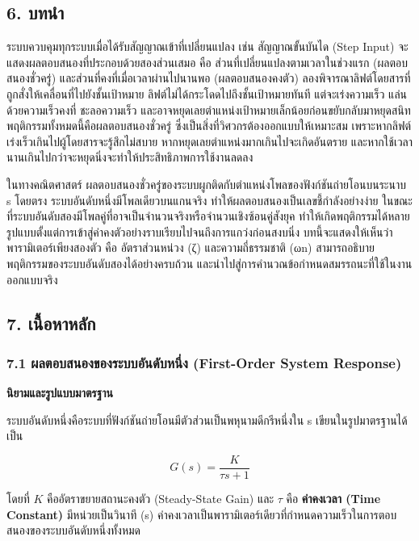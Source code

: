 \newpage

\subsection{6. บทนำ}

ระบบควบคุมทุกระบบเมื่อได้รับสัญญาณเข้าที่เปลี่ยนแปลง เช่น สัญญาณขั้นบันได (Step Input) จะแสดงผลตอบสนองที่ประกอบด้วยสองส่วนเสมอ คือ ส่วนที่เปลี่ยนแปลงตามเวลาในช่วงแรก (ผลตอบสนองชั่วครู่) และส่วนที่คงที่เมื่อเวลาผ่านไปนานพอ (ผลตอบสนองคงตัว) ลองพิจารณาลิฟต์โดยสารที่ถูกสั่งให้เคลื่อนที่ไปยังชั้นเป้าหมาย ลิฟต์ไม่ได้กระโดดไปถึงชั้นเป้าหมายทันที แต่จะเร่งความเร็ว แล่นด้วยความเร็วคงที่ ชะลอความเร็ว และอาจหยุดเลยตำแหน่งเป้าหมายเล็กน้อยก่อนขยับกลับมาหยุดสนิท พฤติกรรมทั้งหมดนี้คือผลตอบสนองชั่วครู่ ซึ่งเป็นสิ่งที่วิศวกรต้องออกแบบให้เหมาะสม เพราะหากลิฟต์เร่งเร็วเกินไปผู้โดยสารจะรู้สึกไม่สบาย หากหยุดเลยตำแหน่งมากเกินไปจะเกิดอันตราย และหากใช้เวลานานเกินไปกว่าจะหยุดนิ่งจะทำให้ประสิทธิภาพการใช้งานลดลง

ในทางคณิตศาสตร์ ผลตอบสนองชั่วครู่ของระบบผูกติดกับตำแหน่งโพลของฟังก์ชันถ่ายโอนบนระนาบ s โดยตรง ระบบอันดับหนึ่งมีโพลเดียวบนแกนจริง ทำให้ผลตอบสนองเป็นเลขชี้กำลังอย่างง่าย ในขณะที่ระบบอันดับสองมีโพลคู่ที่อาจเป็นจำนวนจริงหรือจำนวนเชิงซ้อนคู่สังยุค ทำให้เกิดพฤติกรรมได้หลายรูปแบบตั้งแต่การเข้าสู่ค่าคงตัวอย่างราบเรียบไปจนถึงการแกว่งก่อนสงบนิ่ง บทนี้จะแสดงให้เห็นว่าพารามิเตอร์เพียงสองตัว คือ อัตราส่วนหน่วง (ζ) และความถี่ธรรมชาติ (ωn) สามารถอธิบายพฤติกรรมของระบบอันดับสองได้อย่างครบถ้วน และนำไปสู่การคำนวณข้อกำหนดสมรรถนะที่ใช้ในงานออกแบบจริง



\subsection{7. เนื้อหาหลัก}

\subsubsection{7.1 ผลตอบสนองของระบบอันดับหนึ่ง (First-Order System Response)}

\textbf{นิยามและรูปแบบมาตรฐาน}

ระบบอันดับหนึ่งคือระบบที่ฟังก์ชันถ่ายโอนมีตัวส่วนเป็นพหุนามดีกรีหนึ่งใน s เขียนในรูปมาตรฐานได้เป็น

\[
G(s) = \frac{K}{\tau s + 1}
\]

โดยที่ $K$ คืออัตราขยายสถานะคงตัว (Steady-State Gain) และ $\tau$ คือ \textbf{ค่าคงเวลา (Time Constant)} มีหน่วยเป็นวินาที (s) ค่าคงเวลาเป็นพารามิเตอร์เดียวที่กำหนดความเร็วในการตอบสนองของระบบอันดับหนึ่งทั้งหมด

